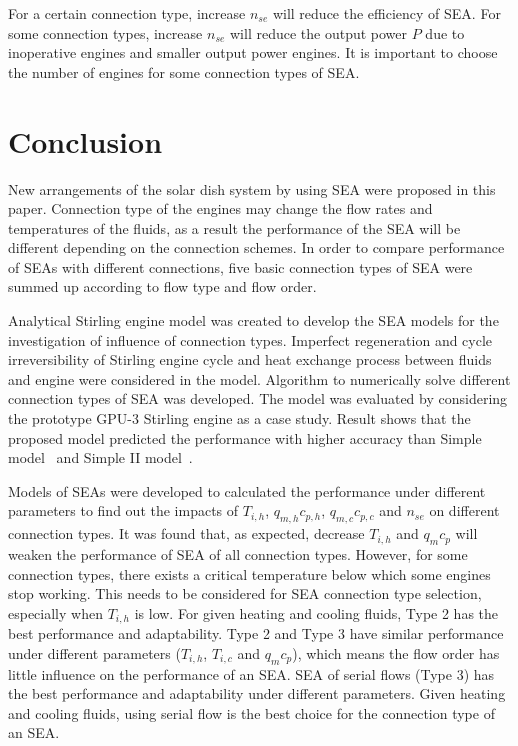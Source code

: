 \documentclass[review,3p,10t]{elsarticle}
\begin{document}
For a certain connection type, increase $n_{se}$ will reduce the efficiency of SEA. For some connection types, increase $n_{se}$ will reduce the output power $P$ due to inoperative engines and smaller output power engines. It is important to choose the number of engines for some connection types of SEA. 

\section{Conclusion}

New arrangements of the solar dish system by using SEA were proposed in this paper. Connection type of the engines may change the flow rates and temperatures of the fluids, as a result the performance of the SEA will be different depending on the connection schemes. In order to compare performance of SEAs with different connections, five basic connection types of SEA were summed up according to flow type and flow order. 

Analytical Stirling engine model was created to develop the SEA models for the investigation of influence of connection types. Imperfect regeneration and cycle irreversibility of Stirling engine cycle and heat exchange process between fluids and engine were considered in the model. Algorithm to numerically solve different connection types of SEA was developed. The model was evaluated by considering the prototype GPU-3 Stirling engine as a case study. Result shows that the proposed model predicted the performance with higher accuracy than Simple model~\cite{Urieli1984} and Simple II model~\cite{Strauss2010}. 

Models of SEAs were developed to calculated the performance under different parameters to find out the impacts of $T_{i,h}$, $q_{m,h}c_{p,h}$, $q_{m,c}c_{p,c}$ and $n_{se}$ on different connection types. It was found that, as expected, decrease $T_{i,h}$ and $q_{m}c_{p}$ will weaken the performance of SEA of all connection types. However, for some connection types, there exists a critical temperature below which some engines stop working. This needs to be considered for SEA connection type selection, especially when $T_{i,h}$ is low. For given heating and cooling fluids, Type 2 has the best performance and adaptability. Type 2 and Type 3 have similar performance under different parameters ($T_{i,h}$, $T_{i,c}$ and $q_mc_p$), which means the flow order has little influence on the performance of an SEA. SEA of serial flows (Type 3) has the best performance and adaptability under different parameters. Given heating and cooling fluids, using serial flow is the best choice for the connection type of an SEA. %
\end{document}
